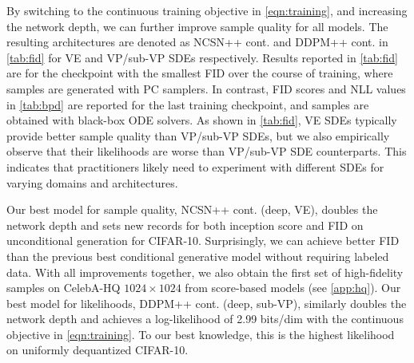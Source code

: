 By switching to the continuous training objective in \cref{eqn:training}, and increasing the network depth, we can further improve sample quality for all models. The resulting architectures are denoted as NCSN++ cont. and DDPM++ cont. in \cref{tab:fid} for VE and VP/sub-VP SDEs respectively. Results reported in \cref{tab:fid} are for the checkpoint with the smallest FID over the course of training, where samples are generated with PC samplers. In contrast, FID scores and NLL values in \cref{tab:bpd} are reported for the last training checkpoint, and samples are obtained with black-box ODE solvers. As shown in \cref{tab:fid}, VE SDEs typically provide better sample quality than VP/sub-VP SDEs, but we also empirically observe that their likelihoods are worse than VP/sub-VP SDE counterparts. This indicates that practitioners likely need to experiment with different SDEs for varying domains and architectures.

Our best model for sample quality, NCSN++ cont. (deep, VE), doubles the network depth and sets new records for both inception score and FID on unconditional generation for CIFAR-10. Surprisingly, we can achieve better FID than the previous best conditional generative model without requiring labeled data. With all improvements together, we also obtain the first set of high-fidelity samples on CelebA-HQ $1024\times 1024$ from score-based models (see \cref{app:hq}). Our best model for likelihoods, DDPM++ cont. (deep, sub-VP), similarly doubles the network depth and achieves a log-likelihood of 2.99 bits/dim with the continuous objective in \cref{eqn:training}. To our best knowledge, this is the highest likelihood on uniformly dequantized CIFAR-10.

